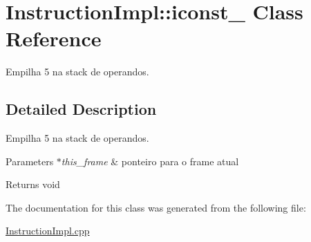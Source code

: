 \hypertarget{class_instruction_impl_1_1iconst__5}{}\section{Instruction\+Impl\+:\+:iconst\+\_ Class Reference}
\label{class_instruction_impl_1_1iconst__5}


Empilha 5 na stack de operandos.  




\subsection{Detailed Description}
Empilha 5 na stack de operandos. 


\begin{DoxyParams}{Parameters}
{\em $\ast$this\+\_\+frame} & ponteiro para o frame atual \\
\hline
\end{DoxyParams}
\begin{DoxyReturn}{Returns}
void 
\end{DoxyReturn}


The documentation for this class was generated from the following file\+:\begin{DoxyCompactItemize}
\item 
\hyperlink{_instruction_impl_8cpp}{Instruction\+Impl.\+cpp}\end{DoxyCompactItemize}
